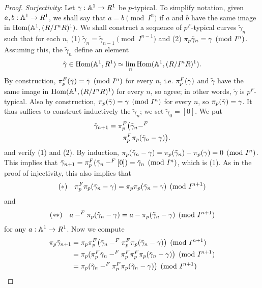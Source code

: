 \begin{proof}
\emph{Surjectivity}:
Let $\gamma: \mathbb A^1 \to R^1$ be $p$-typical.
To simplify notation, given $a, b: \mathbb A^1 \to R^1$, we shall say that $a=b \pmod{I^n}$ if $a$ and $b$ have the same image in $\operatorname{Hom}(\mathbb A^1, (R/I^nR)^1)$.
We shall construct a sequence of $p^F$-typical curves $\tilde \gamma_n$ such that for each $n$, (1) $\tilde\gamma_n = \tilde \gamma_{n-1} \pmod{I^{n-1}}$  and (2) $\mathrm \pi_p \tilde\gamma_n = \gamma \pmod{I^n}$.
Assuming this, the $\tilde \gamma_n$ define an element \[ \tilde \gamma \in \operatorname{Hom}(\mathbb A^1, R^1) \simeq \operatorname*{lim}_n \operatorname{Hom}(\mathbb A^1, (R/I^nR)^1). \]
By construction, $\mathrm \pi_p^F(\tilde \gamma) = \tilde \gamma \pmod{I^n}$ for every $n$, i.e. $\mathrm \pi_p^F(\tilde \gamma)$ and $\tilde \gamma$ have the same image in $\operatorname{Hom}(\mathbb A^1, (R/I^nR)^1)$ for every $n$, so agree; in other words, $\tilde\gamma$ is $p^F$-typical.
Also by construction, $\mathrm \pi_p(\tilde \gamma) = \gamma \pmod{I^n}$ for every $n$, so $\mathrm \pi_p(\tilde \gamma) = \gamma$.
It thus suffices to construct inductively the $\tilde\gamma_n$; we set $\tilde\gamma_0 = [0]$.
We put \[ \begin{aligned} \tilde\gamma_{n+1} &= \mathrm \pi_p^F\bigl(\tilde \gamma_n -^F \\ &\qquad \mathrm \pi_p^F \mathrm \pi_p (\tilde \gamma_n - \gamma)\bigr). \end{aligned} \] and verify (1) and (2).
By induction, $\mathrm \pi_p(\tilde \gamma_n - \gamma) = \mathrm \pi_p(\tilde \gamma_n) - \mathrm \pi_p(\gamma) = 0 \pmod{I^n}$.
This implies that $\tilde\gamma_{n+1} = \mathrm \pi_p^F(\tilde \gamma_n -^F [0]) = \tilde \gamma_n \pmod{I^n}$, which is (1).
As in the proof of injectivity, this also implies that \[ (*) \quad \mathrm \pi_p^F \mathrm \pi_p(\tilde \gamma_n - \gamma) = \mathrm \pi_p \mathrm \pi_p(\tilde \gamma_n - \gamma) \pmod{I^{n+1}} \] and \[ (**) \quad a -^F \mathrm \pi_p(\tilde \gamma_{n}-\gamma) = a - \mathrm \pi_p(\tilde \gamma_{n}-\gamma) \pmod{I^{n+1}} \] for any $a: \mathbb A^1 \to R^1$.
Now we compute
\begin{align*}
\wittprojection_p\tilde\gamma_{n+1} &= \wittprojection_p\wittprojection_p^F\big( \tilde\gamma_{n} -^F \wittprojection_p^F\wittprojection_p(\tilde \gamma_{n}-\gamma)\big) \pmod{I^{n+1}} \\
&=\wittprojection_p(\wittprojection_p^F \tilde\gamma_{n} -^F \wittprojection_p^F\wittprojection_p^F\wittprojection_p(\tilde \gamma_{n}-\gamma)\big) \pmod{I^{n+1}} \\
&=\wittprojection_p(\tilde\gamma_{n} -^F \wittprojection_p^F\wittprojection_p(\tilde \gamma_{n}-\gamma)\big) \pmod{I^{n+1}} \\

\end{align*}
\end{proof}
